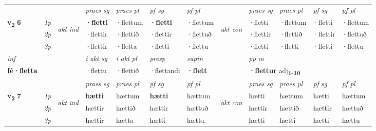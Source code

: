 \begin{longtable}[l]{X>{\footnotesize\itshape}llXXXXlXXXX}
\midrule

 & &   & \textit{praes sg}  & \textit{praes pl}    & \textit{ pf sg} & \textit{pf pl} & & \textit{praes sg}  & \textit{praes pl}    & \textit{pf sg} & \textit{pf pl }  \\ \cmidrule{4-7} \cmidrule{9-12}
 \multirow{2}{*}{{{\textbf{v{\textsubscript{2}}} \Large{\textbf{6}}}}}  & 1p & \multirow{3}{*}{\begin{turn}{90}\textit{akt ind}\end{turn}} & \textbf{·fletti} & ·flettum & \textbf{·fletti} & ·flettum & \multirow{3}{*}{\begin{turn}{90}\textit{akt con}\end{turn}} &·fletti & ·flettum & ·fletti & ·flettum\\*
 & 2p &  &  ·flettir  & ·flettið & ·flettir & ·flettuð & & ·flettir & ·flettið & ·flettir & ·flettuð \\*
 & 3p &  & ·flettir & ·fletta & ·fletti & ·flettu & & ·fletti & ·fletti& ·fletti & ·flettu \\*
\cmidrule{4-7} \cmidrule{9-12}

   {\textit{inf}} & &  & \textit{i akt sg} & \textit{i akt pl}   & \textit{presp} & \textit{supin}  && \textit{pp m} \\*
  {\textbf{fé\allowbreak ·fletta}} & && ·flettu  & ·flettið   & ·flettandi &  \textbf{·flett}  && \multicolumn{2}{l}{\textbf{·flettur} adj\textbf{\textsubscript{1-10}}} \\*

\midrule

 & &   & \textit{praes sg}  & \textit{praes pl}    & \textit{ pf sg} & \textit{pf pl} & & \textit{praes sg}  & \textit{praes pl}    & \textit{pf sg} & \textit{pf pl }  \\ \cmidrule{4-7} \cmidrule{9-12}
 \multirow{2}{*}{{{\textbf{v{\textsubscript{2}}} \Large{\textbf{7}}}}}  & 1p & \multirow{3}{*}{\begin{turn}{90}\textit{akt ind}\end{turn}} & \textbf{hætti} & hættum & \textbf{hætti} & hættum & \multirow{3}{*}{\begin{turn}{90}\textit{akt con}\end{turn}} &hætti & hættum & hætti & hættum\\*
 & 2p &  &  hættir  & hættið & hættir & hættuð & & hættir & hættið & hættir & hættuð \\*
 & 3p &  & hættir & hætta & hætti & hættu & & hætti & hætti& hætti & hættu \\*
\cmidrule{4-7} \cmidrule{9-12}


\end{longtable}
